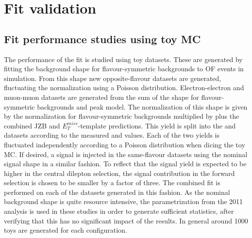 \begin{table}[htbp]
\begin{center}
\end{center}
\end{table}


\section{Fit validation}

\subsection{Fit performance studies using toy MC}
\label{sec:toys}
The performance of the fit is studied using toy datasets. These are generated by fitting the background shape for flavour-symmetric backgrounds to OF events in simulation. From this shape new opposite-flavour datasets are generated, fluctuating the normalization using a Poisson distribution. Electron-electron and muon-muon datasets are generated from the sum of the  shape for flavour-symmetric backgrounds and \Z peak model. The normalization of this shape is given by the normalization for flavour-symmetric backgrounds multiplied by \Rsfof plus the combined JZB and $E_T^{miss}$-template predictions. This yield is split into the \EE and \MM datasets according to the measured \Reeof and \Rmmof values. Each of the two yields is fluctuated independently according to a Poisson distribution when dicing the toy MC. If desired, a signal is injected in the same-flavour datasets using the nominal signal shape in a similar fashion. To reflect that the signal yield is expected to be higher in the central dilepton selection, the signal contribution in the forward selection is chosen to be smaller by a factor of three. The combined fit is performed on each of the datasets generated in this fashion. As the nominal background shape is quite resource intensive, the parametrization from the 2011 analysis is used in these studies in order to generate sufficient statistics, after verifying that this has no significant impact of the results. In general around 1000 toys are generated for each configuration.
